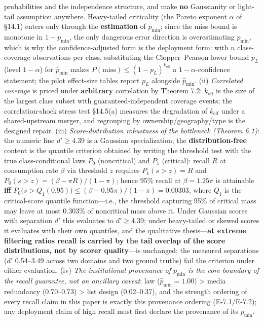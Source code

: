 \documentclass[
  11pt]{article}
\begin{document}
\begin{enumerate}
  probabilities and the independence structure, and make \textbf{no}
  Gaussianity or light-tail assumption anywhere. Heavy-tailed
  criticality (the Pareto exponent \(\alpha\) of §14.1) enters only
  through the \textbf{estimation} of \(p_{\min}\); since the miss bound
  is monotone in \(1-p_{\min}\), the only dangerous error direction is
  overestimating \(p_{\min}\), which is why the confidence-adjusted form
  is the deployment form: with \(n\) class-coverage observations per
  class, substituting the Clopper--Pearson lower bound \(p_L\) (level
  \(1-\alpha\)) for \(\hat p_{\min}\) makes
  \(P(\mathrm{miss}) \le (1-p_L)^{k_{\mathrm{eff}}}\) a
  \(1-\alpha\)-confidence statement; the pilot effect-size tables report
  \(p_L\) alongside \(\hat p_{\min}\). (ii) \emph{Correlated coverage}
  is priced under \textbf{arbitrary} correlation by Theorem 7.2:
  \(k_{\mathrm{eff}}\) is the size of the largest class subset with
  guaranteed-independent coverage events; the correlation-shock stress
  test §14.5(a) measures the degradation of \(k_{\mathrm{eff}}\) under a
  shared-upstream merger, and regrouping by ownership/geography/type is
  the designed repair. (iii) \emph{Score-distribution robustness of the
  bottleneck (Theorem 6.1)}: the numeric line \(d' \ge 4.39\) is a
  Gaussian specialization; the \textbf{distribution-free} content is the
  quantile criterion obtained by writing the threshold test with the
  true class-conditional laws \(P_0\) (noncritical) and \(P_1\)
  (critical): recall \(R\) at consumption rate \(\beta\) via threshold
  \(z\) requires \(P_1(s > z) = R\) and
  \(P_0(s > z) = (\beta - \pi R)/(1-\pi)\); hence 95\% recall at
  \(\beta = 1.25\pi\) is attainable \textbf{iff}
  \(P_0\big(s > Q_1(0.95)\big) \le (\beta - 0.95\pi)/(1-\pi) = 0.00303\),
  where \(Q_1\) is the critical-score quantile function---i.e., the
  threshold capturing 95\% of critical mass may leave at most 0.303\% of
  noncritical mass above it. Under Gaussian scores with separation
  \(d'\) this evaluates to \(d' \ge 4.39\); under heavy-tailed or skewed
  scores it evaluates with their own quantiles, and the qualitative
  thesis---\textbf{at extreme filtering ratios recall is carried by the
  tail overlap of the score distributions, not by scorer quality}---is
  unchanged; the measured separations (\(d'\) 0.54--3.49 across two
  domains and two ground truths) fail the criterion under either
  evaluation. (iv) \emph{The institutional provenance of \(p_{\min}\) is
  the core boundary of the recall guarantee, not an ancillary caveat}:
  law (\(\hat p_{\min}=1.00\)) \textgreater{} media redundancy
  (0.70--0.73) \textgreater{} list design (0.02--0.37), and the strength
  ordering of every recall claim in this paper is exactly this
  provenance ordering (E-7.1/E-7.2); any deployment claim of high recall
  must first declare the provenance of its \(p_{\min}\).
\end{enumerate}
\end{document}
